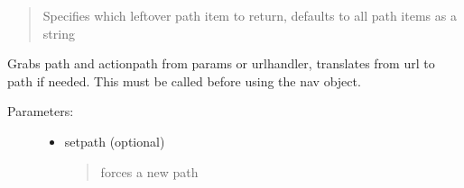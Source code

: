 \documentclass[letterpaper,10pt,english]{sphinxmanual}
\begin{document}
\begin{fulllineitems}
\begin{fulllineitems}
\begin{description}
\begin{itemize}
\begin{quote}
Specifies which leftover path item to return, defaults to all path items as a string
\end{quote}

\end{itemize}

\end{description}

\end{fulllineitems}


\begin{fulllineitems}
\label{knop_nav:knop_nav.getlocation}
\end{fulllineitems}


\begin{fulllineitems}
Grabs path and actionpath from params or urlhandler, translates from url to path
if needed. This must be called before using the nav object.
\begin{description}
\item[{Parameters:}] \leavevmode\begin{itemize}
\item {} 
setpath (optional)
\begin{quote}

forces a new path
\end{quote}

\end{itemize}

\end{description}

\end{fulllineitems}


\begin{fulllineitems}
\label{knop_nav:knop_nav.getlocation_didrun}
\end{fulllineitems}



\begin{fulllineitems}
\end{fulllineitems}


\end{fulllineitems}
\end{document}
